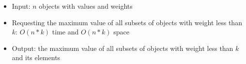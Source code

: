 \begin{itemize}
	\item Input: $n$ objects with values and weights
	\item Requesting the maximum value of all subsets of objects with weight less than $k$: $O(n*k)$ time and $O(n*k)$ space
	\item Output: the maximum value of all subsets of objects with weight less than $k$ and its elements
\end{itemize}